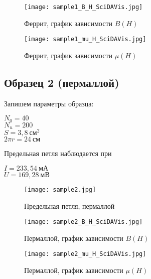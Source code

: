 \begin{figure}
	\centering
	\texttt{[image: sample1\_B\_H\_SciDAVis.jpg]}
	\caption{Феррит, график зависимости $B(H)$}
	\label{sample1_BH}
\end{figure}

\begin{figure}
	\centering
	\texttt{[image: sample1\_mu\_H\_SciDAVis.jpg]}
	\caption{Феррит, график зависимости $\mu(H)$}
	\label{sample1_muH}
\end{figure}

\newpage



\subsection{Образец 2 (пермаллой)}

Запишем параметры образца:

\begin{center}
	$N_0 = 40$                   \\
	$N_u = 200$                  \\
	$S = 3,8 ~ \text{см}^2$      \\
	$2 \pi r = 24 ~ \text{см}$
\end{center}

Предельная петля наблюдается при 

\begin{center}
	$I = 233,54 ~ \text{мА}$ \\
	$U = 169,28 ~ \text{мВ}$
\end{center}

\newpage

\begin{figure}[h!]
	\centering
	\texttt{[image: sample2.jpg]}
	\caption{Предельная петля, пермаллой}
	\label{sample2_pic}
\end{figure}

\begin{figure}
	\centering
	\texttt{[image: sample2\_B\_H\_SciDAVis.jpg]}
	\caption{Пермаллой, график зависимости $B(H)$}
	\label{sample2_BH}
\end{figure}

\begin{figure}
	\centering
	\texttt{[image: sample2\_mu\_H\_SciDAVis.jpg]}
	\caption{Пермаллой, график зависимости $\mu(H)$}
	\label{sample2_muH}
\end{figure}

